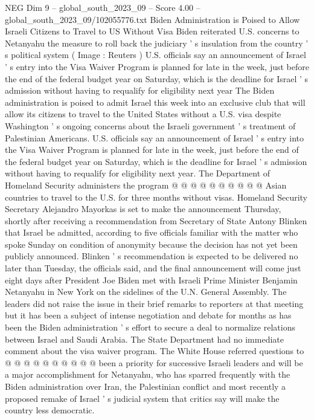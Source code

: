 \begin{textsample}{NEG Dim 9 – global\_south\_2023\_09 – Score 4.00 – global\_south\_2023\_09/102055776.txt}  \label{ex:f9_neg_442}
Biden Administration is Poised to Allow Israeli Citizens to Travel to US Without Visa Biden reiterated U.S. concerns to Netanyahu the measure to roll back the judiciary ' s insulation from the country ' s political system ( Image : Reuters ) U.S. officials say an announcement of Israel ' s entry into the Visa Waiver Program is planned for late in the week, just before the end of the federal budget year on Saturday, which is the deadline for Israel ' s admission without having to requalify for eligibility next year The Biden administration is poised to admit Israel this week into an exclusive club that will allow its citizens to travel to the United States without a U.S. visa despite Washington ' s ongoing concerns about the Israeli government ' s treatment of Palestinian Americans.
U.S. officials say an announcement of Israel ' s entry into the Visa Waiver Program is planned for late in the week, just before the end of the federal budget year on Saturday, which is the deadline for Israel ' s admission without having to requalify for eligibility next year.
The Department of Homeland Security administers the program @ @ @ @ @ @ @ @ @ @ Asian countries to travel to the U.S. for three months without visas.
Homeland Security Secretary Alejandro Mayorkas is set to make the announcement Thursday, shortly after receiving a recommendation from Secretary of State Antony Blinken that Israel be admitted, according to five officials familiar with the matter who spoke Sunday on condition of anonymity because the decision has not yet been publicly announced.
Blinken ' s recommendation is expected to be delivered no later than Tuesday, the officials said, and the final announcement will come just eight days after President Joe Biden met with Israeli Prime Minister Benjamin Netanyahu in New York on the sidelines of the U.N.
General Assembly.
The leaders did not raise the issue in their brief remarks to reporters at that meeting but it has been a subject of intense negotiation and debate for months as has been the Biden administration ' s effort to secure a deal to normalize relations between Israel and Saudi Arabia.
The State Department had no immediate comment about the visa waiver program.
The White House referred questions to @ @ @ @ @ @ @ @ @ @ been a priority for successive Israeli leaders and will be a major accomplishment for Netanyahu, who has sparred frequently with the Biden administration over Iran, the Palestinian conflict and most recently a proposed remake of Israel ' s judicial system that critics say will make the country less democratic.

\end{textsample}
